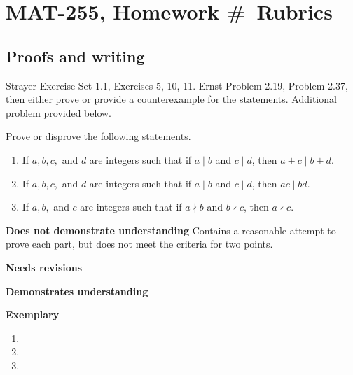 \documentclass[letterpaper, 11pt]{../ximera}
\begin{document}
\chapter{MAT-255, Homework \#\homework\ Rubrics}

\section*{Proofs and writing}  %
Strayer Exercise Set 1.1, Exercises 5, 10, 11. Ernst Problem 2.19, Problem 2.37, then either prove or provide a counterexample for the statements. Additional problem provided below.

\begin{ex}
 Prove or disprove the following statements.
	\begin{enumerate}[label=(\alph*)] %
		\item If $a,b,c,$ and $d$ are integers such that if $a\mid b$ and $c\mid d$, then $a+c\mid b+d$.
		\item If $a,b,c,$ and $d$ are integers such that if $a\mid b$ and $c\mid d$, then $ac\mid bd$.
		\item If $a,b,$ and $c$ are integers such that if $a\nmid b$ and $b\nmid c$, then $a\nmid c$.
	\end{enumerate}
\end{ex}

\begin{writeRubric}
    \item \textbf{Does not demonstrate understanding}
     Contains a reasonable attempt to prove each part, but does not meet the criteria for two points.
    \item \textbf{Needs revisions}
     
    \item \textbf{Demonstrates understanding}
    
    \item \textbf{Exemplary}
        
\end{writeRubric}
                                       
\begin{solution}
 	\begin{enumerate}[label=(\alph*)] %
		\item %
		\item %
		\item %
	\end{enumerate}
\end{solution}
\end{document}
